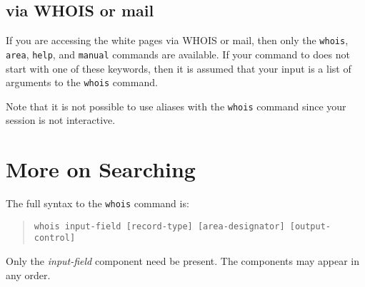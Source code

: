 \subsection	{via WHOIS or mail}
If you are accessing the white pages via WHOIS or mail,
then only the \verb"whois", \verb"area", \verb"help", and \verb"manual"
commands are available.
If your command to  does not start with one of these keywords,
then it is assumed that your input is a list of arguments to the
\verb"whois" command.

Note that it is not possible to use aliases with the \verb"whois" command
since your  session is not interactive.

\section	{More on Searching}
The full syntax to the \verb"whois" command is:
\begin{quote}\small\begin{verbatim}
whois input-field [record-type] [area-designator] [output-control]
\end{verbatim}\end{quote}
Only the {\em input-field\/} component need be present.
The components may appear in any order.

